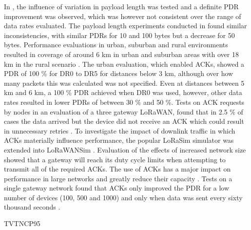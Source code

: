 In \cite{sanchez-iborra_performance_2018},
	the influence of variation in payload length was tested and a definite PDR improvement was observed,
	which was however not consistent over the range of data rates evaluated.
The payload length experiments conducted in \cite{aref_free_2014} found similar inconsistencies,
	with similar PDRs for 10 and 100 bytes but a decrease for 50 bytes.
Performance evaluations in urban,
	suburban and rural environments resulted in coverage of around 6 km in urban and suburban areas with over 18 km in the rural scenario \cite{sanchez-iborra_performance_2018}.
The urban evaluation,
	which enabled ACKs,
	showed a PDR of 100 \% for DR0 to DR5 for distances below 3 km,
although over how many packets this was calculated was not specified.
Even at distances between 5 km and 6 km,
	a 100 \% PDR achieved
when DR0 was used,
	however,
	other data rates resulted in lower PDRs of between 30 \% and 50 \%.
Tests on ACK requests by nodes in an evaluation of a three gateway LoRaWAN,
	found that in 2.5 \% of cases the data
arrived but the device did not receive an ACK which could result in unnecessary retries \cite{wixted_evaluation_2016}.
To investigate the impact of downlink traffic in which ACKs materially influence performance,
	the popular LoRaSim simulator was extended into LoRaWANSim \cite{pop_does_2017}.
Evaluation of the effects of increased network size showed that a gateway will reach its duty cycle limits when attempting to transmit all of the required ACKs.
The use of ACKs has a major impact on performance in large networks and greatly reduce their capacity \cite{pop_does_2017}.
Tests on a single gateway network found that ACKs only improved the PDR for a low number of devices (100, 500 and 1000) and only when data was sent every sixty thousand seconds \cite{abeele_scalability_2017}.

\cite{pop_does_2017} TVTNCP95

